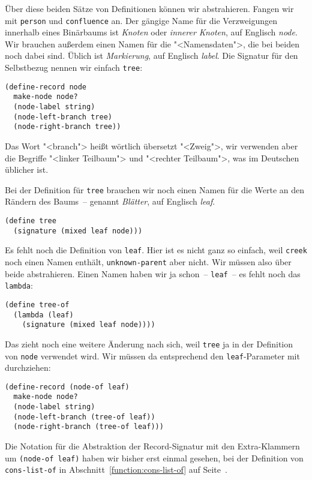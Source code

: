 Über diese beiden Sätze von Definitionen können wir abstrahieren.
Fangen wir mit \lstinline{person} und \lstinline{confluence} an.  Der
gängige Name für die Verzweigungen innerhalb eines Binärbaums ist
\textit{Knoten} oder \textit{innerer Knoten}, auf
Englisch \textit{node}.  Wir brauchen außerdem einen Namen für die
"<Namensdaten">, die bei beiden noch dabei sind.  Üblich ist
\textit{Markierung}, auf Englisch \textit{label}.
Die Signatur für den Selbstbezug nennen wir einfach \lstinline{tree}:
%
\begin{lstlisting}
(define-record node
  make-node node?
  (node-label string)
  (node-left-branch tree)
  (node-right-branch tree))
\end{lstlisting}
%
Das Wort "<branch"> heißt wörtlich übersetzt "<Zweig">, wir verwenden
aber die Begriffe "<linker Teilbaum"> und "<rechter Teilbaum">, was im
Deutschen üblicher ist.

Bei der Definition für \lstinline{tree} brauchen wir noch einen Namen
für die Werte an den Rändern des Baums~-- genannt
\textit{Blätter}, auf Englisch \textit{leaf}.
%
\begin{lstlisting}
(define tree
  (signature (mixed leaf node)))
\end{lstlisting}
%
Es fehlt noch die Definition von \lstinline{leaf}.  Hier ist es nicht
ganz so einfach, weil \lstinline{creek} noch einen Namen enthält,
\lstinline{unknown-parent} aber nicht.  Wir müssen also über beide
abstrahieren.  Einen Namen haben wir ja schon~-- \lstinline{leaf}~--
es fehlt noch das \lstinline{lambda}:
%
\begin{lstlisting}
(define tree-of
  (lambda (leaf)
    (signature (mixed leaf node))))
\end{lstlisting}
%
Das zieht noch eine weitere Änderung nach sich, weil \lstinline{tree}
ja in der Definition von \lstinline{node} verwendet wird.  Wir müssen
da entsprechend den \lstinline{leaf}-Parameter mit durchziehen:
%
\begin{lstlisting}
(define-record (node-of leaf)
  make-node node?
  (node-label string)
  (node-left-branch (tree-of leaf))
  (node-right-branch (tree-of leaf)))
\end{lstlisting}
%
Die Notation für die Abstraktion der Record-Signatur mit den
Extra-Klammern um \lstinline{(node-of leaf)} haben wir bisher erst
einmal gesehen, bei der Definition von \lstinline{cons-list-of} in
Abschnitt~\ref{function:cons-list-of} auf Seite~\pageref{function:cons-list-of}.

